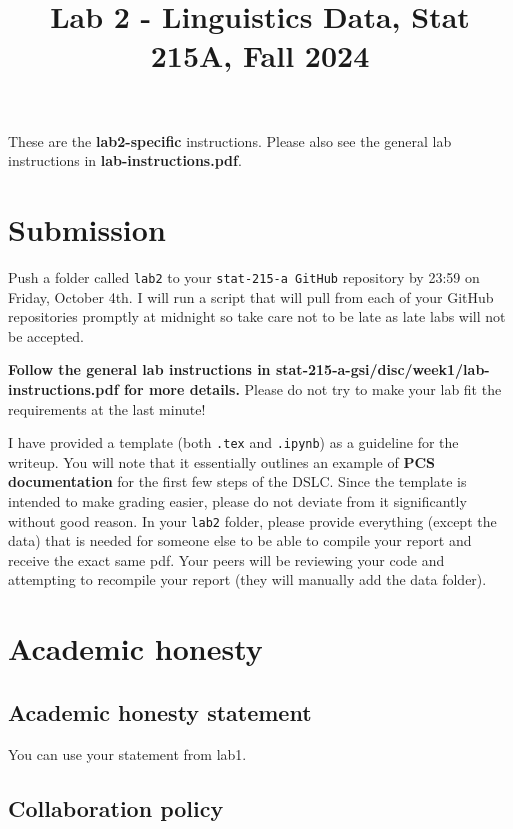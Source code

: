 \documentclass[letterpaper,12pt]{article}
\title{Lab 2 - Linguistics Data, Stat 215A, Fall 2024\vspace{-2em}}
\begin{document}
\maketitle

These are the \textbf{lab2-specific} instructions. Please also see the general lab instructions in \textbf{lab-instructions.pdf}.

\tableofcontents

\section{Submission}
Push a folder called \texttt{lab2} to your \texttt{stat-215-a GitHub} repository by 23:59 on Friday, October 4th. I will run a script that will pull from each of your GitHub repositories promptly at midnight so take care not to be late as late labs will not be accepted.

\textbf{Follow the general lab instructions in stat-215-a-gsi/disc/week1/lab-instructions.pdf for more details.} Please do not try to make your lab fit the requirements at the last minute!

I have provided a template (both \texttt{.tex} and \texttt{.ipynb}) as a guideline for the writeup. You will note that it essentially outlines an example of \textbf{PCS documentation} for the first few steps of the DSLC. Since the template is intended to make grading easier, please do not deviate from it significantly without good reason. In your \texttt{lab2} folder, please provide everything (except the data) that is needed for someone else to be able to compile your report and receive the exact same pdf. Your peers will be reviewing your code and attempting to recompile your report (they will manually add the data folder).

\section{Academic honesty}

\subsection{Academic honesty statement}

You can use your statement from lab1.

\subsection{Collaboration policy}
\end{document}
